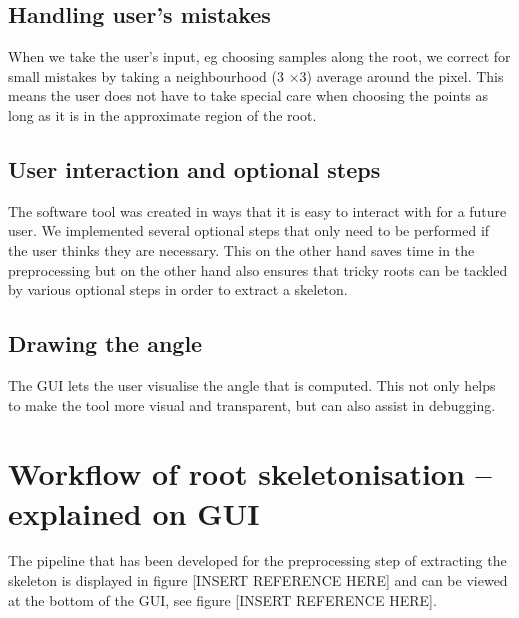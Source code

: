 \subsection{Handling user's mistakes}

When we take the user's input, eg choosing samples along the root, we correct for small mistakes by taking a neighbourhood (3 \(\times\)3) average around the pixel. 
This means the user does not have to take special care when choosing the points as long as it is in the approximate region of the root.

\subsection{User interaction and optional steps}
The software tool was created in ways that it is easy to interact with for a future user. 
We implemented several optional steps that only need to be performed if the user thinks they are necessary. This on the other hand saves time in the preprocessing but on the other hand also ensures that tricky roots can be tackled by various optional steps in order to extract a skeleton. 

\subsection{Drawing the angle}
The GUI lets the user visualise the angle that is computed. This not only helps to make the tool more visual and transparent, but can also assist in debugging. 


\section{Workflow of root skeletonisation -- explained on GUI}

The pipeline that has been developed for the preprocessing step of extracting the skeleton is displayed in figure [INSERT REFERENCE HERE] and can be viewed at the bottom of the GUI, see figure [INSERT REFERENCE HERE].

